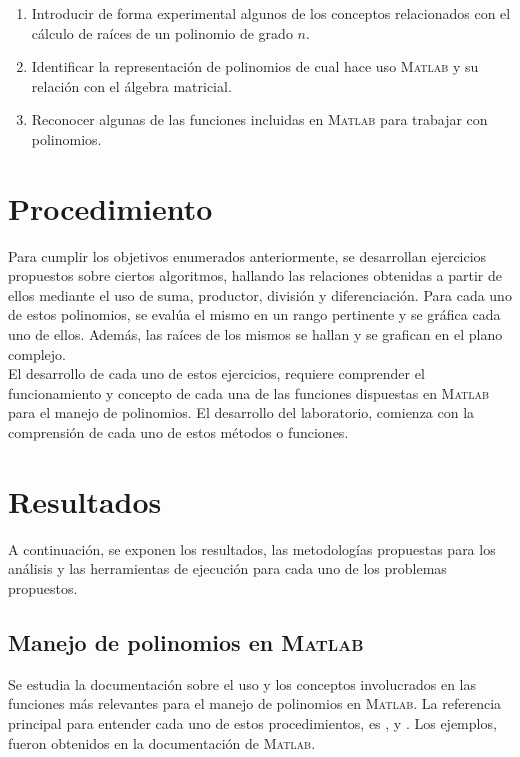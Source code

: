 \documentclass[11pt, spanish]{article}
\begin{document}
\begin{enumerate}
\item Introducir de forma experimental algunos de los conceptos relacionados con el cálculo de raíces de un polinomio de grado $n$.
\item Identificar la representación de polinomios de cual hace uso \textsc{Matlab} y su relación con el álgebra matricial.
\item Reconocer algunas de las funciones incluidas en \textsc{Matlab} para trabajar con polinomios.
\end{enumerate}

\section{Procedimiento}

Para cumplir los objetivos enumerados anteriormente, se desarrollan ejercicios propuestos sobre ciertos algoritmos, hallando las relaciones obtenidas a partir de ellos mediante el uso de suma, productor, división y diferenciación. Para cada uno de estos polinomios, se evalúa el mismo en un rango pertinente y se gráfica cada uno de ellos. Además, las raíces de los mismos se hallan y se grafican en el plano complejo.\\

 El desarrollo de cada uno de estos ejercicios, requiere comprender el funcionamiento y concepto de cada una de las funciones dispuestas en \textsc{Matlab} para el manejo de polinomios. El desarrollo del laboratorio, comienza con la comprensión de cada uno de estos métodos o funciones.

\section{Resultados}

A continuación, se exponen los resultados, las metodologías propuestas para los análisis y las herramientas de ejecución para cada uno de los problemas propuestos.

\subsection{Manejo de polinomios en \textsc{Matlab}}
Se estudia la documentación sobre el uso y los conceptos involucrados en las funciones más relevantes para el manejo de polinomios en \textsc{Matlab}. La referencia principal para entender cada uno de estos procedimientos, es \cite{lopez2014matlab}, y \cite{yang2005applied}. Los ejemplos, fueron obtenidos en la documentación de \textsc{Matlab}.
\end{document}
